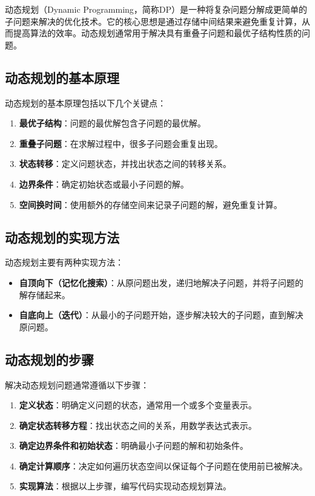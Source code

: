 \documentclass[12pt]{article}
\begin{document}
动态规划（Dynamic Programming，简称DP）是一种将复杂问题分解成更简单的子问题来解决的优化技术。它的核心思想是通过存储中间结果来避免重复计算，从而提高算法的效率。动态规划通常用于解决具有重叠子问题和最优子结构性质的问题。

\subsection{动态规划的基本原理}

动态规划的基本原理包括以下几个关键点：

\begin{enumerate}
\item \textbf{最优子结构}：问题的最优解包含子问题的最优解。


\item \textbf{重叠子问题}：在求解过程中，很多子问题会重复出现。

\item \textbf{状态转移}：定义问题状态，并找出状态之间的转移关系。

\item \textbf{边界条件}：确定初始状态或最小子问题的解。

\item \textbf{空间换时间}：使用额外的存储空间来记录子问题的解，避免重复计算。
\end{enumerate}

\subsection{动态规划的实现方法}

动态规划主要有两种实现方法：

\begin{itemize}
\item \textbf{自顶向下（记忆化搜索）}：从原问题出发，递归地解决子问题，并将子问题的解存储起来。


\item \textbf{自底向上（迭代）}：从最小的子问题开始，逐步解决较大的子问题，直到解决原问题。
\end{itemize}

\subsection{动态规划的步骤}

解决动态规划问题通常遵循以下步骤：

\begin{enumerate}
\item \textbf{定义状态}：明确定义问题的状态，通常用一个或多个变量表示。


\item \textbf{确定状态转移方程}：找出状态之间的关系，用数学表达式表示。

\item \textbf{确定边界条件和初始状态}：明确最小子问题的解和初始条件。

\item \textbf{确定计算顺序}：决定如何遍历状态空间以保证每个子问题在使用前已被解决。

\item \textbf{实现算法}：根据以上步骤，编写代码实现动态规划算法。
\end{enumerate}
\end{document}
